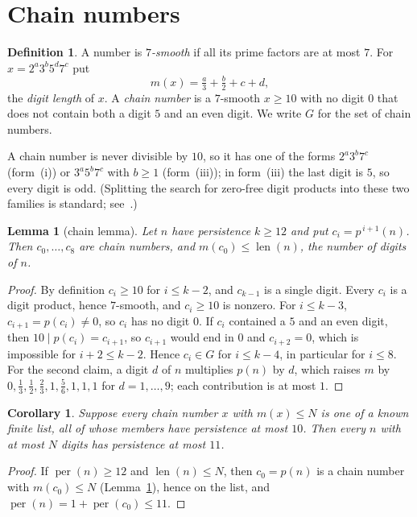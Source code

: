 \documentclass[11pt]{article}
\newtheorem{lemma}[theorem]{Lemma}
\newtheorem{corollary}[theorem]{Corollary}
\theoremstyle{definition}
\newtheorem{definition}[theorem]{Definition}
\begin{document}
\section{Chain numbers}\label{sec:chain}

\begin{definition}
A number is \emph{$7$-smooth} if all its prime factors are at most $7$. For $x=2^a3^b5^d7^c$ put
\[ m(x)=\tfrac{a}{3}+\tfrac{b}{2}+c+d, \]
the \emph{digit length} of $x$. A \emph{chain number} is a $7$-smooth $x\ge 10$ with no digit $0$ that does not contain
both a digit $5$ and an even digit. We write $G$ for the set of chain numbers.
\end{definition}

A chain number is never divisible by $10$, so it has one of the forms $2^a3^b7^c$ (form~(i)) or $3^a5^b7^c$ with $b\ge1$
(form~(iii)); in form~(iii) the last digit is $5$, so every digit is odd. (Splitting the search for zero-free digit
products into these two families is standard; see~\cite{mcelwee}.)

\begin{lemma}[chain lemma]\label{lem:chain}
Let $n$ have persistence $k\ge 12$ and put $c_i=p^{\,i+1}(n)$. Then $c_0,\dots,c_8$ are chain numbers, and
$m(c_0)\le \operatorname{len}(n)$, the number of digits of $n$.
\end{lemma}

\begin{proof}
By definition $c_i\ge 10$ for $i\le k-2$, and $c_{k-1}$ is a single digit. Every $c_i$ is a digit product, hence
$7$-smooth, and $c_i\ge10$ is nonzero. For $i\le k-3$, $c_{i+1}=p(c_i)\neq 0$, so $c_i$ has no digit $0$. If $c_i$ contained a
$5$ and an even digit, then $10\mid p(c_i)=c_{i+1}$, so $c_{i+1}$ would end in $0$ and $c_{i+2}=0$, which is impossible for
$i+2\le k-2$. Hence $c_i\in G$ for $i\le k-4$, in particular for $i\le 8$. For the second claim, a digit $d$ of $n$
multiplies $p(n)$ by $d$, which raises $m$ by $0,\tfrac13,\tfrac12,\tfrac23,1,\tfrac56,1,1,1$ for $d=1,\dots,9$; each
contribution is at most $1$.
\end{proof}

\begin{corollary}\label{cor:reduction}
Suppose every chain number $x$ with $m(x)\le N$ is one of a known finite list, all of whose members have
persistence at most $10$. Then every $n$ with at most $N$ digits has persistence at most $11$.
\end{corollary}

\begin{proof}
If $\operatorname{per}(n)\ge 12$ and $\operatorname{len}(n)\le N$, then $c_0=p(n)$ is a chain number with $m(c_0)\le N$
(Lemma~\ref{lem:chain}), hence on the list, and $\operatorname{per}(n)=1+\operatorname{per}(c_0)\le 11$.
\end{proof}
\end{document}
